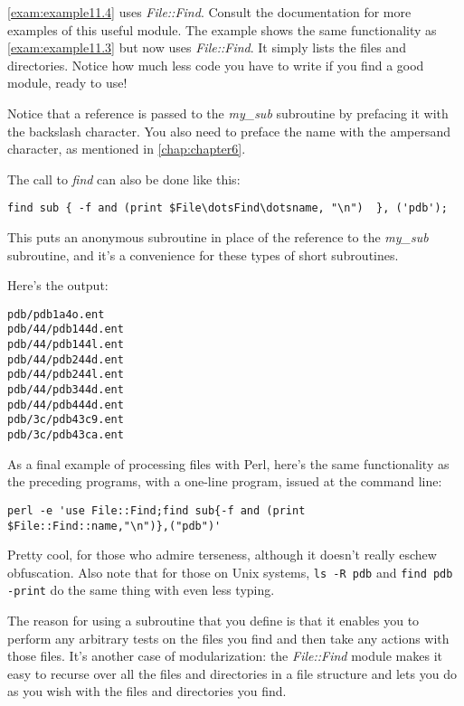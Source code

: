 \autoref{exam:example11.4} uses \textit{File::Find}. Consult the documentation for more examples of this useful module. The example shows the same functionality as \autoref{exam:example11.3} but now uses \textit{File::Find}. It simply lists the files and directories. Notice how much less code you have to write if you find a good module, ready to use! 



Notice that a reference is passed to the \textit{my\_sub} subroutine by prefacing it with the backslash character. You also need to preface the name with the ampersand character, as mentioned in \autoref{chap:chapter6}.

The call to \textit{find} can also be done like this:

\begin{lstlisting}
find sub { -f and (print $File\dotsFind\dotsname, "\n")  }, ('pdb');
\end{lstlisting}

This puts an anonymous subroutine in place of the reference to the \textit{my\_sub} subroutine, and it's a convenience for these types of short subroutines. 

Here's the output:

\begin{lstlisting}
pdb/pdb1a4o.ent
pdb/44/pdb144d.ent
pdb/44/pdb144l.ent
pdb/44/pdb244d.ent
pdb/44/pdb244l.ent
pdb/44/pdb344d.ent
pdb/44/pdb444d.ent
pdb/3c/pdb43c9.ent
pdb/3c/pdb43ca.ent
\end{lstlisting}

As a final example of processing files with Perl, here's the same functionality as the preceding programs, with a one-line program, issued at the command line: 

\begin{lstlisting}
perl -e 'use File::Find;find sub{-f and (print $File::Find::name,"\n")},("pdb")'
\end{lstlisting}

Pretty cool, for those who admire terseness, although it doesn't really eschew obfuscation. Also note that for those on Unix systems, \verb|ls -R pdb| and \verb|find pdb -print| do the same thing with even less typing.

The reason for using a subroutine that you define is that it enables you to perform any arbitrary tests on the files you find and then take any actions with those files. It's another case of modularization: the \textit{File::Find} module makes it easy to recurse over all the files and directories in a file structure and lets you do as you wish with the files and directories you find. 

